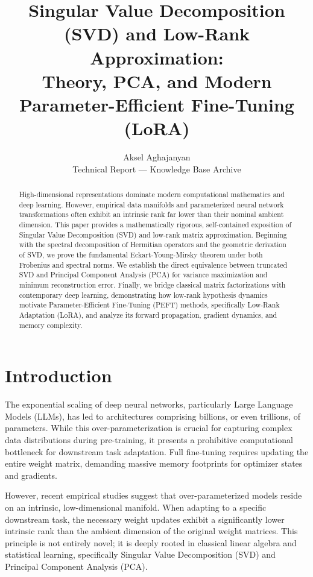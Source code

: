 \documentclass[11pt,journal,onecolumn]{IEEEtran}
\begin{document}
\title{Singular Value Decomposition (SVD) and Low-Rank Approximation: \\ Theory, PCA, and Modern Parameter-Efficient Fine-Tuning (LoRA)}

\author{Aksel Aghajanyan \\ \small Technical Report --- Knowledge Base Archive}

\maketitle

\begin{abstract}
High-dimensional representations dominate modern computational mathematics and deep learning. However, empirical data manifolds and parameterized neural network transformations often exhibit an intrinsic rank far lower than their nominal ambient dimension. This paper provides a mathematically rigorous, self-contained exposition of Singular Value Decomposition (SVD) and low-rank matrix approximation. Beginning with the spectral decomposition of Hermitian operators and the geometric derivation of SVD, we prove the fundamental Eckart-Young-Mirsky theorem under both Frobenius and spectral norms. We establish the direct equivalence between truncated SVD and Principal Component Analysis (PCA) for variance maximization and minimum reconstruction error. Finally, we bridge classical matrix factorizations with contemporary deep learning, demonstrating how low-rank hypothesis dynamics motivate Parameter-Efficient Fine-Tuning (PEFT) methods, specifically Low-Rank Adaptation (LoRA), and analyze its forward propagation, gradient dynamics, and memory complexity.
\end{abstract}



\section{Introduction}
The exponential scaling of deep neural networks, particularly Large Language Models (LLMs), has led to architectures comprising billions, or even trillions, of parameters. While this over-parameterization is crucial for capturing complex data distributions during pre-training, it presents a prohibitive computational bottleneck for downstream task adaptation. Full fine-tuning requires updating the entire weight matrix, demanding massive memory footprints for optimizer states and gradients.

However, recent empirical studies suggest that over-parameterized models reside on an intrinsic, low-dimensional manifold. When adapting to a specific downstream task, the necessary weight updates exhibit a significantly lower intrinsic rank than the ambient dimension of the original weight matrices. This principle is not entirely novel; it is deeply rooted in classical linear algebra and statistical learning, specifically Singular Value Decomposition (SVD) and Principal Component Analysis (PCA).
\end{document}
